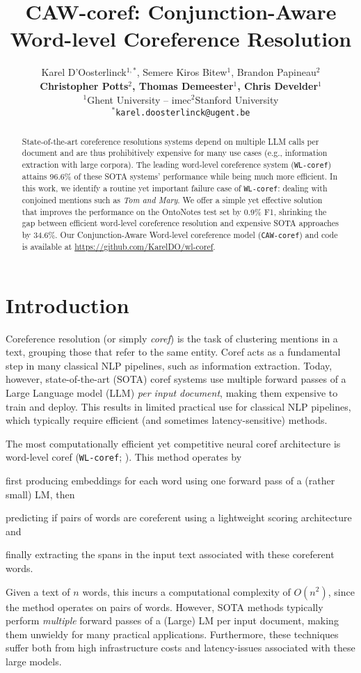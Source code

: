 \documentclass[11pt]{article}
\title{\emojicaw CAW-coref: Conjunction-Aware Word-level Coreference Resolution}
\author{Karel D'Oosterlinck$^{1,*}$, Semere Kiros Bitew$^{1}$, Brandon Papineau$^{2}$ \\ \textbf{Christopher Potts$^{2}$, Thomas Demeester$^{1}$, Chris Develder$^{1}$} \\
  $^1$Ghent University -- imec\qquad$^2$Stanford University  \\
  $^*$\texttt{karel.doosterlinck@ugent.be}
}
\newcommand\wlcoref{{\texttt{WL-coref}}}
\newcommand\cawcoref{{\texttt{CAW-coref}}}
\begin{document}
\maketitle

\begin{abstract}
State-of-the-art coreference resolutions systems depend on multiple LLM calls per document and are thus prohibitively expensive for many use cases (e.g., information extraction with large corpora). The leading word-level coreference system (\wlcoref{}) attains 96.6\% of these SOTA systems' performance while being much more efficient. In this work, we identify a routine yet important 
failure case of \wlcoref{}: dealing with conjoined mentions such as \emph{Tom and Mary}. 
We offer a simple yet effective solution that improves the performance on the OntoNotes test set by 0.9\% F1, shrinking the gap between efficient word-level coreference resolution and expensive SOTA approaches by 34.6\%. Our Conjunction-Aware Word-level coreference model (\cawcoref{}) and code is available at \url{https://github.com/KarelDO/wl-coref}.

\end{abstract}


\section{Introduction}


Coreference resolution (or simply \textit{coref}) is the task of clustering mentions in a text, grouping those that refer to the same entity. Coref acts as a fundamental step in many classical NLP pipelines, such as information extraction. Today, however, state-of-the-art (SOTA) coref systems use multiple forward passes of a Large Language model (LLM) \textit{per input document}, making them expensive to train and deploy. This results in limited practical use for classical NLP pipelines, which typically require efficient (and sometimes latency-sensitive) methods.

The most computationally efficient yet competitive neural coref architecture is word-level coref (\wlcoref{}; \citealp{dobrovolskii-2021-word}). 
This method operates by 
\begin{enumerate*}[(i)]
    \item first producing embeddings for each word using one forward pass of a (rather small) LM, then
    \item predicting if pairs of words are coreferent using a lightweight scoring architecture and
    \item finally extracting the 
    spans in the input text associated with these coreferent words.
\end{enumerate*}
Given a text of $n$ words, this incurs a computational complexity of $O(n^2)$, since the method operates on pairs of words. However, SOTA methods typically perform \emph{multiple} forward passes of a (Large) LM per input document, making them unwieldy for many practical applications. Furthermore, these techniques suffer both from high infrastructure costs and latency-issues associated with these large models.
\end{document}
